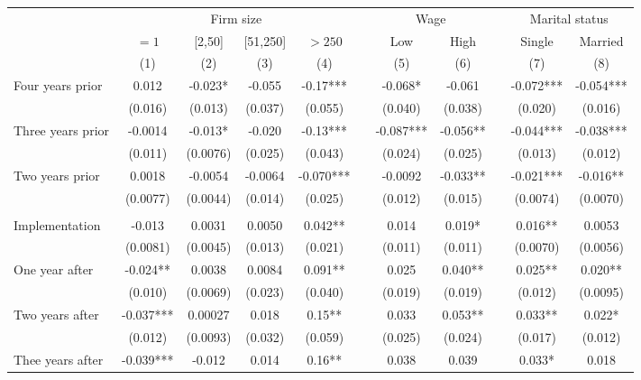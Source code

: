 \begin{tabular}{lcccccccccc}
\toprule
      & \multicolumn{4}{c}{Firm size} &       & \multicolumn{2}{c}{Wage} &       & \multicolumn{2}{c}{Marital status} \\
\cmidrule{2-5}\cmidrule{7-8}\cmidrule{10-11}      & $= 1 $ & [2,50] & [51,250] & $> 250$ &       & Low   & High  &       & Single & Married \\
\midrule
      & (1)   & (2)   & (3)   & (4)   &       & (5)   & (6)   &       & (7)   & (8) \\
\midrule
\midrule
Four years prior & 0.012 & -0.023* & -0.055 & -0.17*** &       & -0.068* & -0.061 &       & -0.072*** & -0.054*** \\
      & (0.016) & (0.013) & (0.037) & (0.055) &       & (0.040) & (0.038) &       & (0.020) & (0.016) \\
Three years prior & -0.0014 & -0.013* & -0.020 & -0.13*** &       & -0.087*** & -0.056** &       & -0.044*** & -0.038*** \\
      & (0.011) & (0.0076) & (0.025) & (0.043) &       & (0.024) & (0.025) &       & (0.013) & (0.012) \\
Two years prior & 0.0018 & -0.0054 & -0.0064 & -0.070*** &       & -0.0092 & -0.033** &       & -0.021*** & -0.016** \\
      & (0.0077) & (0.0044) & (0.014) & (0.025) &       & (0.012) & (0.015) &       & (0.0074) & (0.0070) \\
      &       &       &       &       &       &       &       &       &       &  \\
Implementation & -0.013 & 0.0031 & 0.0050 & 0.042** &       & 0.014 & 0.019* &       & 0.016** & 0.0053 \\
      & (0.0081) & (0.0045) & (0.013) & (0.021) &       & (0.011) & (0.011) &       & (0.0070) & (0.0056) \\
One year after & -0.024** & 0.0038 & 0.0084 & 0.091** &       & 0.025 & 0.040** &       & 0.025** & 0.020** \\
      & (0.010) & (0.0069) & (0.023) & (0.040) &       & (0.019) & (0.019) &       & (0.012) & (0.0095) \\
Two years after & -0.037*** & 0.00027 & 0.018 & 0.15** &       & 0.033 & 0.053** &       & 0.033** & 0.022* \\
      & (0.012) & (0.0093) & (0.032) & (0.059) &       & (0.025) & (0.024) &       & (0.017) & (0.012) \\
Thee years after & -0.039*** & -0.012 & 0.014 & 0.16** &       & 0.038 & 0.039 &       & 0.033* & 0.018 \\

\end{tabular}
